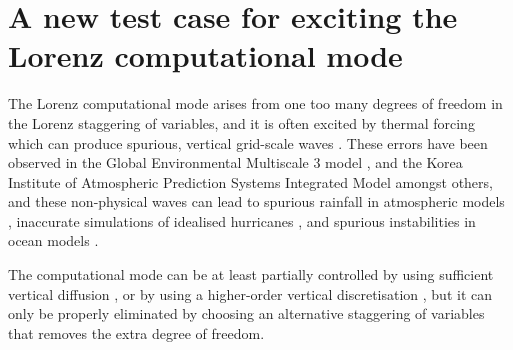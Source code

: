 \chapter{A new test case for exciting the Lorenz computational mode}
\label{ch:cp}

The Lorenz computational mode arises from one too many degrees of freedom in the Lorenz staggering of variables, and it is often excited by thermal forcing which can produce spurious, vertical grid-scale waves \citep{schneider1987,arakawa-konor1996}.
These errors have been observed in the Global Environmental Multiscale 3 model \citep{girard2014}, and the Korea Institute of Atmospheric Prediction Systems Integrated Model \citep{yi-park2017} amongst others, and these non-physical waves can lead to spurious rainfall in atmospheric models \citep{hollingsworth1995}, inaccurate simulations of idealised hurricanes \citep{zhu-smith2003}, and spurious instabilities in ocean models \citep{bell-white2017}.

The computational mode can be at least partially controlled by using sufficient vertical diffusion \citep{chang1992,zadra2004}, or by using a higher-order vertical discretisation \citep{untch-hortal2004,guerra-ullrich2016,yi-park2017}, but it can only be properly eliminated by choosing an alternative staggering of variables that removes the extra degree of freedom.  





